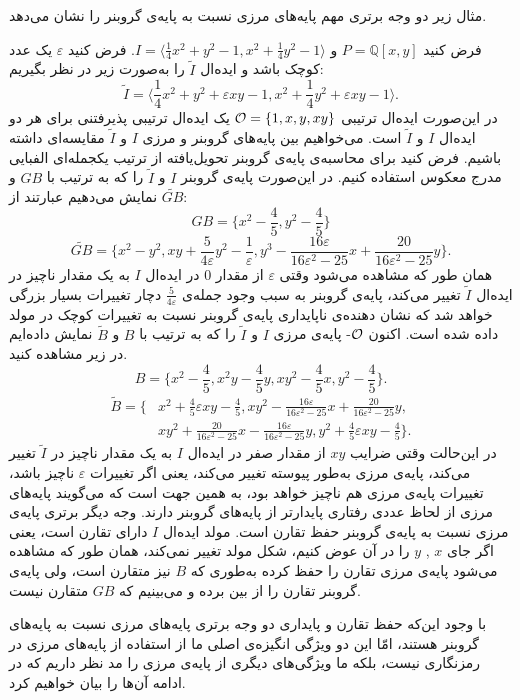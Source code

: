 مثال زیر دو وجه برتری مهم پایه‌های مرزی نسبت به پایه‌ی گروبنر را نشان می‌دهد.
\begin{example}
فرض کنید 
$P = \mathbb{Q}[x,y]$
و
$I = \langle \frac{1}{4}x^{2}+y^{2}-1, x^{2} +\frac{1}{4}y^{2} - 1 \rangle$.
فرض کنید 
$\varepsilon$
یک عدد کوچک باشد و ایده‌ال 
$\tilde{I}$
را به‌صورت زیر در نظر بگیریم:
$$\tilde{I} = \langle \frac{1}{4}x^{2} + y^{2} +\varepsilon xy -1, x^{2} + \frac{1}{4}y^{2} +\varepsilon xy -1 \rangle.$$
در این‌صورت ایده‌ال ترتیبی 
${\mathcal O} = \{1,x,y,xy\}$
یک ایده‌ال ترتیبی پذیرفتنی برای هر دو ایده‌ال 
$I$
و
$\tilde{I}$
است. می‌خواهیم بین پایه‌های گروبنر و مرزی 
$I$
و
$\tilde{I}$
مقایسه‌ای داشته باشیم. فرض کنید برای محاسبه‌ی پایه‌ی گروبنر تحویل‌یافته از ترتیب یکجمله‌ای الفبایی مدرج معکوس استفاده کنیم. در این‌صورت پایه‌ی گروبنر 
$I$
و
$\tilde{I}$
را که به ترتیب با 
$GB$
و
$\tilde{GB}$
نمایش می‌دهیم عبارتند از:
$$GB = \{x^{2} - \frac{4}{5}, y^{2} - \frac{4}{5}\}$$
$$\tilde{GB} = \{x^{2} - y^{2}, xy + \frac{5}{4\varepsilon}y^{2} - \frac{1}{\varepsilon}, y^{3} - \frac{16\varepsilon}{16\varepsilon^{2} - 25}x + \frac{20}{16\varepsilon^{2} - 25}y\}.$$
همان طور که مشاهده می‌شود وقتی 
$\varepsilon$
از مقدار 
$0$
در ایده‌ال 
$I$
به یک مقدار ناچیز در ایده‌ال 
$\tilde{I}$
تغییر می‌کند، پایه‌ی گروبنر به سبب وجود جمله‌ی 
$\frac{5}{4\varepsilon}$
دچار تغییرات بسیار بزرگی خواهد شد که نشان دهنده‌ی ناپایداری پایه‌ی گروبنر نسبت به تغییرات کوچک در مولد داده شده است. اکنون 
${\mathcal O}$-
پایه‌ی مرزی 
$I$
و
$\tilde{I}$
را که به ترتیب با 
$B$
و
$\tilde{B}$
نمایش داده‌ایم در زیر مشاهده کنید.
$$B = \{x^{2}-\frac{4}{5}, x^{2}y - \frac{4}{5}y, xy^{2} - \frac{4}{5}x, y^{2} -
 \frac{4}{5}\}.$$
\begin{align*}
\tilde{B} = \{&x^{2} + \frac{4}{5}\varepsilon xy - \frac{4}{5}, xy^{2} - \frac{16\varepsilon}{16\varepsilon^{2} - 25}x + \frac{20}{16\varepsilon^{2} - 25}y,\\
&xy^{2} + \frac{20}{16\varepsilon^{2} - 25}x -\frac{16\varepsilon}{16\varepsilon^{2} - 25}y, y^{2} +\frac{4}{5}\varepsilon xy -\frac{4}{5}\}.
\end{align*}
در این‌حالت وقتی ضرایب 
$xy$
از مقدار صفر در ایده‌ال 
$I$
به یک مقدار ناچیز در 
$\tilde{I}$
تغییر می‌کند، پایه‌ی مرزی به‌طور پیوسته تغییر می‌کند، یعنی اگر تغییرات 
$\varepsilon$
ناچیز باشد، تغییرات پایه‌ی مرزی هم ناچیز خواهد بود، به همین جهت است که می‌گویند پایه‌های مرزی از لحاظ عددی رفتاری پایدارتر از پایه‌های گروبنر دارند. وجه دیگر برتری  پایه‌ی مرزی نسبت به پایه‌ی گروبنر حفظ تقارن است. مولد ایده‌ال 
$I$
دارای تقارن است، یعنی اگر جای 
$x$
,
$y$
را در آن عوض کنیم، شکل مولد تغییر نمی‌کند، همان طور که مشاهده می‌شود پایه‌ی مرزی تقارن را حفظ کرده به‌طوری که 
$B$
نیز متقارن است، ولی پایه‌ی گروبنر تقارن را از بین برده و می‌بینیم که 
$GB$
متقارن نیست. 
\end{example}
با وجود این‌که حفظ تقارن و پایداری دو وجه برتری پایه‌های مرزی نسبت به پایه‌های گروبنر هستند، امّا این دو ویژگی انگیزه‌ی اصلی ما از استفاده از پایه‌های مرزی در رمزنگاری نیست، بلکه ما ویژگی‌های دیگری از پایه‌ی مرزی را مد نظر داریم که در ادامه آن‌ها را بیان خواهیم کرد.


